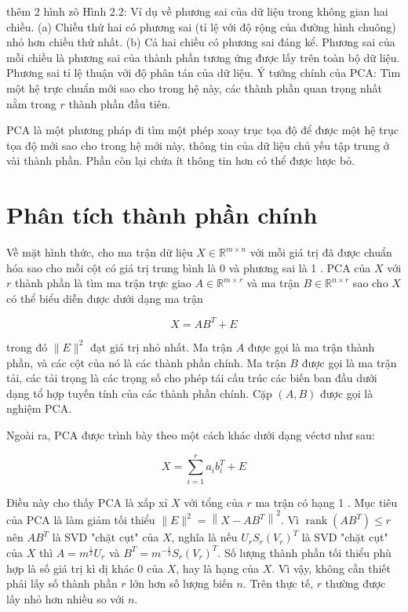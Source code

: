 \documentclass[12pt,a4paper,oneside]{report}
\numberwithin{equation}{section}
\begin{document}
thêm 2 hình zô 
Hình 2.2: Ví dụ về phương sai của dữ liệu trong không gian hai chiều. (a) Chiều thứ hai có phương sai (tỉ lệ với độ rộng của đường hình chuông) nhỏ hơn chiều thứ nhất. (b) Cả hai chiều có phương sai đáng kể. Phương sai của mỗi chiều là phương sai của thành phần tương ứng được lấy trên toàn bộ dữ liệu. Phương sai tỉ lệ thuận với độ phân tán của dữ liệu. Ý tưởng chính của PCA: Tìm một hệ trực chuẩn mới sao cho trong hệ này, các thành phần quan trọng nhất nằm trong $r$ thành phần đầu tiên.

PCA là một phương pháp đi tìm một phép xoay trục tọa độ để được một hệ trục tọa độ mới sao cho trong hệ mới này, thông tin của dữ liệu chủ yếu tập trung ở vài thành phần. Phần còn lại chứa ít thông tin hơn có thể được lược bỏ.

\section{Phân tích thành phần chính}

Về mặt hình thức, cho ma trận dữ liệu $X \in \mathbb{R}^{m \times n}$ với mỗi giá trị đã được chuẩn hóa sao cho mỗi cột có giá trị trung bình là 0 và phương sai là 1 . PCA của $X$ với $r$ thành phần là tìm ma trận trực giao $A \in \mathbb{R}^{m \times r}$ và ma trận $B \in \mathbb{R}^{n \times r}$ sao cho $X$ có thể biểu diễn được dưới dạng ma trận

$$
X=A B^{T}+E
$$

trong đó $\|E\|^{2}$ đạt giá trị nhỏ nhất. Ma trận $A$ được gọi là ma trận thành phần, và các cột của nó là các thành phần chính. Ma trận $B$ được gọi là ma trận tải, các tải trọng là các trọng số cho phép tái cấu trúc các biến ban đầu dưới dạng tổ hợp tuyến tính của các thành phần chính. Cặp $(A, B)$ được gọi là nghiệm PCA.

Ngoài ra, PCA được trình bày theo một cách khác dưới dạng véctơ như sau:

$$
X=\sum_{i=1}^{r} a_{i} b_{i}^{T}+E
$$

Điều này cho thấy $\mathrm{PCA}$ là xấp xỉ $X$ với tổng của $r$ ma trận có hạng 1 .
Mục tiêu của PCA là làm giảm tối thiểu $\|E\|^{2}=\left\|X-A B^{T}\right\|^{2}$. Vì $\operatorname{rank}\left(A B^{T}\right) \leq r$ nên $A B^{T}$ là SVD "chặt cụt" của $X$, nghĩa là nếu $U_{r} S_{r}\left(V_{r}\right)^{T}$ là SVD "chặt cụt" của $X$ thì $A=m^{\frac{1}{2}} U_{r}$ và $B^{T}=m^{-\frac{1}{2}} S_{r}\left(V_{r}\right)^{T}$. Số lượng thành phần tối thiểu phù hợp là số giá trị kì dị khác 0 của $X$, hay là hạng của $X$. Vì vậy, không cần thiết phải lấy số thành phần $r$ lớn hơn số lượng biến $n$. Trên thực tế, $r$ thường được lấy nhỏ hơn nhiều so với $n$.
\end{document}
